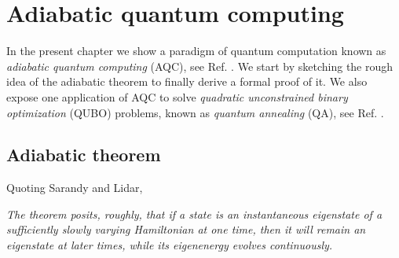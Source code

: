 
\chapter{Adiabatic quantum computing} %

\label{Chapter1} %
In the present chapter we show a paradigm of quantum computation known as \textit{adiabatic quantum computing} (AQC), see Ref. \cite{Farhi2000QuantumEvolution}. We start by sketching the rough idea of the adiabatic theorem to finally derive a formal proof of it. We also expose one application of AQC to solve \textit{quadratic unconstrained binary optimization} (QUBO) problems, known as \textit{quantum annealing} (QA), see Ref. \cite{Kadowaki1998QuantumModel}.

\section{Adiabatic theorem}
Quoting Sarandy and Lidar,
\begin{displayquote}
\textit{The theorem posits, roughly, that if a state is an instantaneous eigenstate of a sufficiently slowly varying Hamiltonian at one time, then it will remain an eigenstate at later times, while its eigenenergy evolves continuously.}
\end{displayquote}
